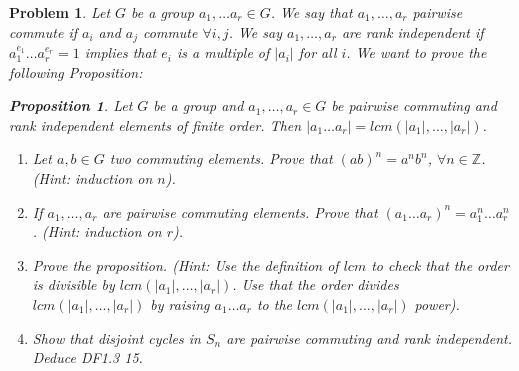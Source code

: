 \documentclass[11 pt]{article}
\newtheorem{Prob}{Problem}
\newtheorem{Prop}{Proposition}
\theoremstyle{definition}
\theoremstyle{remark}
\begin{document}
\begin{Prob}
	Let $G$ be a group $a_1,\dots a_r\in G$. We say that $a_1, \dots, a_r$ pairwise commute if $a_i$ and $a_j$ commute $\forall i,j$. We say $a_1,\dots, a_r$ are rank independent if $a_1^{e_1}\dots a_r^{e_r}=1$ implies that $e_i$ is a multiple of $|a_i|$ for all $i$. We want to prove the following Proposition:
	\begin{Prop}
		Let $G$ be a group and $a_1,\dots, a_r\in G$ be pairwise commuting and rank independent elements of finite order. Then $|a_1\dots a_r|=lcm(|a_1|,\dots, |a_r|)$.
	\end{Prop}
\begin{enumerate}
	\item Let $a,b\in G$ two commuting elements. Prove that $(ab)^n=a^nb^n$, $\forall n\in\mathbb{Z}$. (Hint: induction on $n$).
	\item If $a_1,\dots, a_r$ are pairwise commuting elements. Prove that $(a_1\dots a_r)^n=a_1^n\dots a_r^n$. (Hint: induction on $r$).
	\item Prove the proposition. (Hint: Use the definition of $lcm$ to check that the order is divisible by $lcm(|a_1|,\dots, |a_r|)$. Use that the order divides $lcm(|a_1|,\dots, |a_r|)$ by raising $a_1\dots a_r$ to the $lcm(|a_1|,\dots, |a_r|)$ power).
	\item Show that disjoint cycles in $S_n$ are pairwise commuting and rank independent. Deduce DF1.3 15.
\end{enumerate}
\end{Prob}
\end{document}
